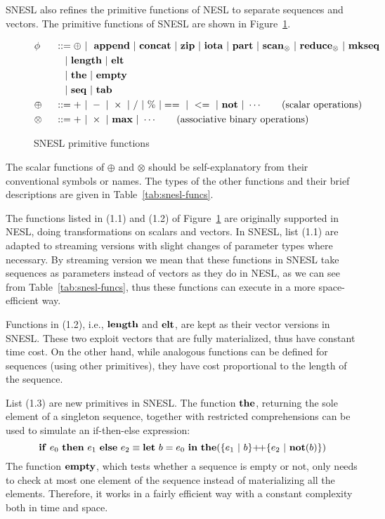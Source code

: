 SNESL also refines the primitive functions of NESL to separate sequences and vectors.
The primitive functions of SNESL are shown in Figure~\ref{fig-snesl-func}.

\begin{figure}[H]\large
\begin{alignat}{2} 
&\phi && ::= \oplus \ | \ \ \mathbf{append} \ | \ \mathbf{concat} \ | \ \mathbf{zip} \ | \ \mathbf{iota}  \ | \ \mathbf{part}  \ | \ \mathbf{scan}_{\otimes} \ | \ \mathbf{reduce}_{\otimes} \ | \ \mathbf{mkseq} \\
&   && \quad | \ \mathbf{length} \ | \ \mathbf{elt} \\
&   && \quad | \ \mathbf{the}  \ | \ \mathbf{empty} \\
&   && \quad | \ \mathbf{seq} \ | \ \mathbf{tab} \\
& \oplus  \ && :: = + \ | \ - \ | \ \times \ |  \  / \ | \ \% \ | ==  \ |\ <=  \ | \ \mathbf{not} \ | \ \cdots \tag{scalar operations} \\
& \otimes \ && :: = + \ | \ \times  \ | \ \mathbf{max} \ | \ \cdots \tag{associative binary operations}
\end{alignat}
\caption{SNESL primitive functions \label{fig-snesl-func}}
\end{figure}

The scalar functions of $\oplus$ and $\otimes$ should be self-explanatory from their conventional symbols or names. 
The types of the other functions and their brief descriptions are given in Table~\ref{tab:snesl-funcs}.

The functions listed in (1.1) and (1.2) of Figure~\ref{fig-snesl-func} are originally supported in NESL, doing transformations on scalars and vectors.
In SNESL, list (1.1) are adapted to streaming versions with slight changes of parameter types where necessary.
By streaming version we mean that these functions in SNESL take sequences as parameters instead of vectors as they do in NESL, as we can see from Table~\ref{tab:snesl-funcs}, thus these functions can execute in a more space-efficient way.  

Functions in (1.2), i.e., $\mathbf{length}$ and $\mathbf{elt}$, are kept as their vector versions in SNESL. 
These two exploit vectors that are fully materialized, thus have constant time cost.
On the other hand, while analogous functions can be defined for sequences (using other primitives), they have cost proportional to the length of the sequence.

List (1.3) are new primitives in SNESL.  
The function $\mathbf{the}$, returning the sole element of a singleton sequence, together with restricted comprehensions can be used to simulate an if-then-else expression:
$$\*{if} \ e_0 \ \*{then} \ e_1 \ \*{else} \ e_2 \equiv \Let{b}{e_0}{ \*{the}(\{e_1 \ | \ b \} {\++} \{e_2 \ | \ \*{not}(b)\})} $$
The function $\mathbf{empty}$, which tests whether a sequence is empty or not, only needs to check at most one element of the sequence instead of materializing all the elements. Therefore, it works in a fairly efficient way with a constant complexity both in time and space.


